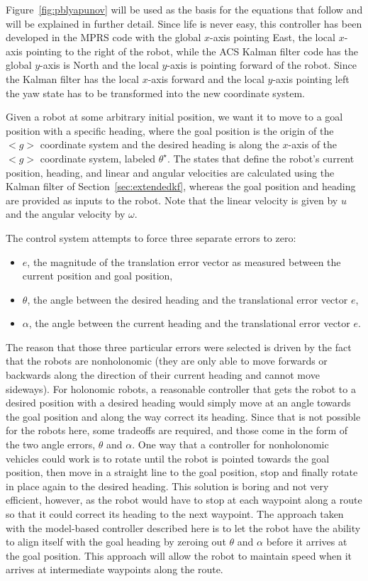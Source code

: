Figure~\ref{fig:pblyapunov} will be used as the basis for the equations that follow and will be explained in further detail.
Since life is never easy, this controller has been developed in the MPRS code with the global $x$-axis pointing East, the local $x$-axis pointing to the right of the robot, while the ACS Kalman filter code has the global $y$-axis is North and the local $y$-axis is pointing forward of the robot.
Since the Kalman filter has the local $x$-axis forward and the local $y$-axis pointing left the yaw state has to be transformed into the new coordinate system.

Given a robot at some arbitrary initial position, we want it to move to a goal position with a specific heading, where the goal position is the origin of the $<g>$ coordinate system and the desired heading is along the $x$-axis of the $<g>$ coordinate system, labeled $\theta^\star$.
The states that define the robot's current position, heading, and linear and angular velocities are calculated using the Kalman filter of Section~\ref{sec:extendedkf}, whereas the goal position and heading are provided as inputs to the robot.
Note that the linear velocity is given by $u$ and the angular velocity by $\omega$.

The control system attempts to force three separate errors to zero:
\begin{itemize}
\item $e$, the magnitude of the translation error vector as measured between the current position and goal position,
\item $\theta$, the angle between the desired heading and the translational error vector $e$,
\item $\alpha$, the angle between the current heading and the translational error vector $e$.
\end{itemize}

The reason that those three particular errors were selected is driven by the fact that the robots are nonholonomic (they are only able to move forwards or backwards along the direction of their current heading and cannot move sideways).
For holonomic robots, a reasonable controller that gets the robot to a desired position with a desired heading would simply move at an angle towards the goal position and along the way correct its heading.
Since that is not possible for the robots here, some tradeoffs are required, and those come in the form of the two angle errors, $\theta$ and $\alpha$.
One way that a controller for nonholonomic vehicles could work is to rotate until the robot is pointed towards the goal position, then move in a straight line to the goal position, stop and finally rotate in place again to the desired heading.
This solution is boring and not very efficient, however, as the robot would have to stop at each waypoint along a route so that it could correct its heading to the next waypoint.
The approach taken with the model-based controller described here is to let the robot have the ability to align itself with the goal heading by zeroing out $\theta$ and $\alpha$ before it arrives at the goal position.
This approach will allow the robot to maintain speed when it arrives at intermediate waypoints along the route.

